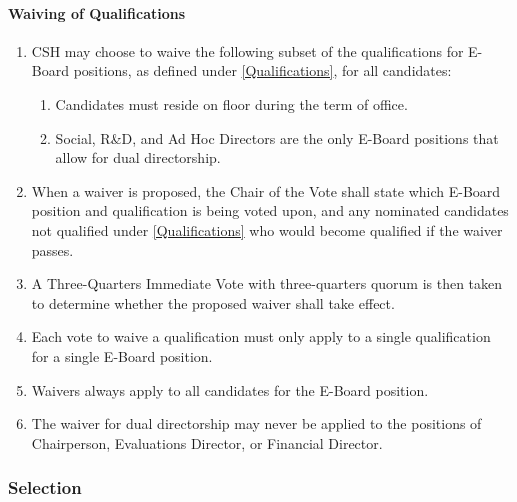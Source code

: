 \documentclass{article}
\newcommand{\asubsection}[1]{\subsubsection{#1} \label{#1}}
\newcommand{\asubsubsection}[1]{\paragraph{#1} \label{#1}}
\begin{document}
\asubsubsection{Waiving of Qualifications}
\begin{enumerate}
	\item CSH may choose to waive the following subset of the qualifications for E-Board positions, as defined under \ref{Qualifications}, for all candidates:
	      \begin{enumerate}
		      \item Candidates must reside on floor during the term of office.
		      \item Social, R\&D, and Ad Hoc Directors are the only E-Board positions that allow for dual directorship.
	      \end{enumerate}
	\item When a waiver is proposed, the Chair of the Vote shall state which E-Board position and qualification is being voted upon, and any nominated candidates not qualified under \ref{Qualifications} who would become qualified if the waiver passes.
	\item A Three-Quarters Immediate Vote with three-quarters quorum is then taken to determine whether the proposed waiver shall take effect.
	\item Each vote to waive a qualification must only apply to a single qualification for a single E-Board position.
	\item Waivers always apply to all candidates for the E-Board position.
	\item The waiver for dual directorship may never be applied to the positions of Chairperson, Evaluations Director, or Financial Director.
\end{enumerate}

\asubsection{Selection}
\end{document}
